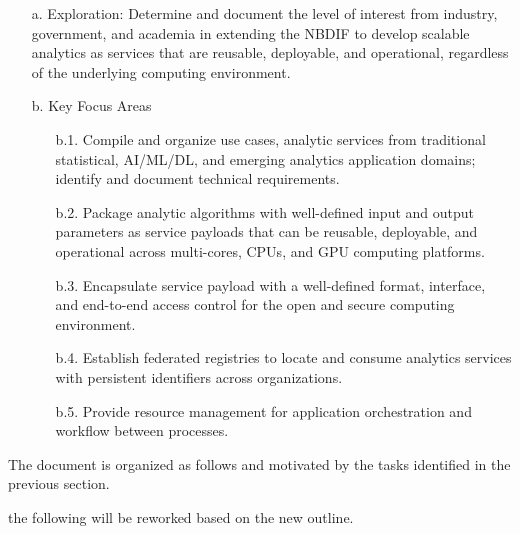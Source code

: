 \begin{enumerate}
  
\item[a.] Exploration: Determine and document the level of interest
  from industry, government, and academia in extending the NBDIF to
  develop scalable analytics as services that are reusable,
  deployable, and operational, regardless of the underlying computing
  environment.

\item[b.] Key Focus Areas

  \begin{enumerate}

  \item[b.1.] Compile and organize use cases, analytic services from
    traditional statistical, AI/ML/DL, and emerging analytics
    application domains; identify and document technical requirements.

   \item[b.2.] Package analytic algorithms with well-defined input and
     output parameters as service payloads that can be reusable,
     deployable, and operational across multi-cores, CPUs, and GPU
     computing platforms.

   \item[b.3.] Encapsulate service payload with a well-defined format,
     interface, and end-to-end access control for the open and secure
     computing environment.

   \item[b.4.] Establish federated registries to locate and consume
     analytics services with persistent identifiers across
     organizations.

   \item[b.5.] Provide resource management for application
     orchestration and workflow between processes.

  \end{enumerate}
  
\end{enumerate}





The document is organized as follows and motivated by the tasks
identified in the previous section.

 the following will be reworked based on the new outline.

